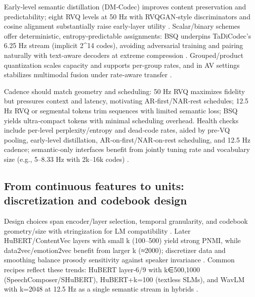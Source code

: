 Early‑level semantic distillation (DM‑Codec) improves content preservation and predictability; eight RVQ levels at 50 Hz with RVQGAN‑style discriminators and cosine alignment substantially raise early‑layer utility \cite{ahasan2025dmcodecdistillingmultimodalrepresentatio}. Scalar/binary schemes offer deterministic, entropy‑predictable assignments: BSQ underpins TaDiCodec’s 6.25 Hz stream (implicit 2^{14} codes), avoiding adversarial training and pairing naturally with text‑aware decoders at extreme compression \cite{wang2025tadicodectextawarediffusionspeechtokeniz}. Grouped/product quantization scales capacity and supports per‑group rates, and in AV settings stabilizes multimodal fusion under rate‑aware transfer \cite{sadok2025vectorquantizedmaskedautoencoderaudiovis}.

Cadence should match geometry and scheduling: 50 Hz RVQ maximizes fidelity but pressures context and latency, motivating AR‑first/NAR‑rest schedules; 12.5 Hz RVQ or segmental tokens trim sequences with limited semantic loss; BSQ yields ultra‑compact tokens with minimal scheduling overhead. Health checks include per‑level perplexity/entropy and dead‑code rates, aided by pre‑VQ pooling, early‑level distillation, AR‑on‑first/NAR‑on‑rest scheduling, and 12.5 Hz cadence; semantic‑only interfaces benefit from jointly tuning rate and vocabulary size (e.g., 5–8.33 Hz with 2k–16k codes) \cite{peng2024mslms2stmultitaskspeechlanguagemodeltext,zeng2024scalingspeechtextpretrainingsyntheticint,yang2025diffsoundstreamefficientspeechtokenizati,wang2025tadicodectextawarediffusionspeechtokeniz,ahasan2025dmcodecdistillingmultimodalrepresentatio,baade2024syllablelmlearningcoarsesemanticunitsspe}.

\subsection{From continuous features to units: discretization and codebook design} \label{subsec:From continuous features to units: discretization and codebook design}
Design choices span encoder/layer selection, temporal granularity, and codebook geometry/size with stringization for LM compatibility \cite{guo2025recentadvancesdiscretespeechtokensreview}. Later HuBERT/ContentVec layers with small k (100–500) yield strong PNMI, while data2vec/emotion2vec benefit from larger k (≈2000); discretizer data and smoothing balance prosody sensitivity against speaker invariance \cite{onda2025benchmarkingprosodyencodingdiscretespeec}. Common recipes reflect these trends: HuBERT layer‑6/9 with k∈{500,1000} (SpeechComposer/SHuBERT), HuBERT+k=100 (textless SLMs), and WavLM with k=2048 at 12.5 Hz as a single semantic stream in hybrids \cite{wu2024speechcomposerunifyingmultiplespeechtask,hsu2024exploringcontextlearningtextlessspeechla,yang2025diffsoundstreamefficientspeechtokenizati}.

